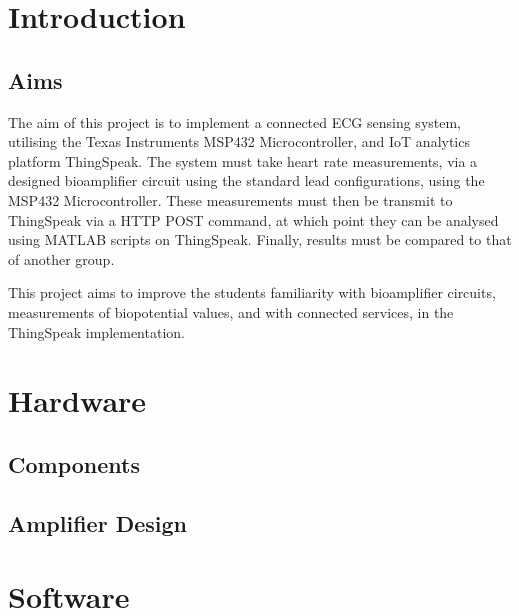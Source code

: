 \documentclass[11pt,a4paper,headinclude=false,footinclude=false]{scrreprt}
\begin{document}


\setcounter{secnumdepth}{1}
\setcounter{tocdepth}{1}
\tableofcontents
\listoftables
\listoffigures
\hypertarget{introduction}{%
\chapter{Introduction}\label{introduction}}

\hypertarget{aims}{%
\section{Aims}\label{aims}}

The aim of this project is to implement a connected ECG sensing system,
utilising the Texas Instruments MSP432 Microcontroller, and IoT
analytics platform ThingSpeak. The system must take heart rate
measurements, via a designed bioamplifier circuit using the standard
lead configurations, using the MSP432 Microcontroller. These
measurements must then be transmit to ThingSpeak via a HTTP POST
command, at which point they can be analysed using MATLAB scripts on
ThingSpeak. Finally, results must be compared to that of another group.

This project aims to improve the students familiarity with bioamplifier
circuits, measurements of biopotential values, and with connected
services, in the ThingSpeak implementation.

\hypertarget{hardware}{%
\chapter{Hardware}\label{hardware}}

\hypertarget{components}{%
\section{Components}\label{components}}

\hypertarget{amplifier-design}{%
\section{Amplifier Design}\label{amplifier-design}}

\hypertarget{software}{%
\chapter{Software}\label{software}}
\end{document}
